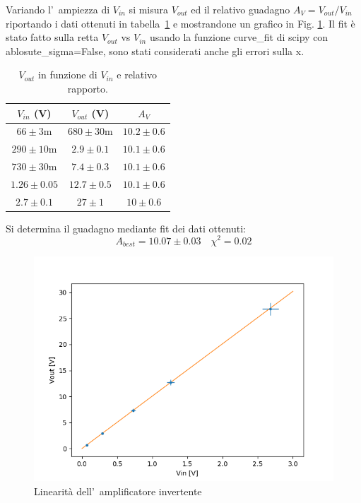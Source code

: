 \documentclass[10pt,a4paper]{article}
\begin{document}
Variando l'~ampiezza di $V_{in}$ si misura $V_{out}$ ed il relativo guadagno $A_V=V_{out}/V_{in}$ riportando i dati ottenuti in tabella~\ref{tab:guadagno} 
e mostrandone un grafico in Fig. \ref{fig:lin}. Il fit è stato fatto sulla retta $V_{out}$ vs $V_{in}$ usando la funzione curve\_fit di scipy con ablosute\_sigma=False, sono stati considerati anche gli errori sulla x.

\begin{table}[h]
\caption{$V_{out}$ in funzione di $V_{in}$ e relativo rapporto.}
\label{tab:guadagno}
\begin{center}
\begin{tabular}{|c|c|c|}
\hline
$V_{in}$ (V) & $V_{out}$ (V)  & $A_V$ \\
\hline
\hline
$66 \pm 3\mathrm{m} $ & $680 \pm 30\mathrm{m} $ & $10.2 \pm 0.6 $ \\
\hline
$290 \pm 10\mathrm{m} $ & $2.9 \pm 0.1 $ & $10.1 \pm 0.6 $ \\
\hline
$730 \pm 30\mathrm{m} $ & $7.4 \pm 0.3 $ & $10.1 \pm 0.6 $ \\
\hline
$1.26 \pm 0.05 $ & $12.7 \pm 0.5 $ & $10.1 \pm 0.6 $ \\
\hline
$2.7 \pm 0.1 $ & $27 \pm 1 $ & $10 \pm 0.6 $ \\
\hline
\end{tabular}
\end{center}
\end{table}

Si determina il guadagno mediante fit dei dati ottenuti:
\[
A_{best} = 10.07 \pm 0.03 \quad  \chi^2 = 0.02
\]
\begin{figure}[t]
\begin{center}
\includegraphics[width=0.8\linewidth]{1c.png}
\caption{\small Linearit\`a dell'~amplificatore invertente}
\label{fig:lin}
\end{center}
\end{figure}
%
\end{document}
